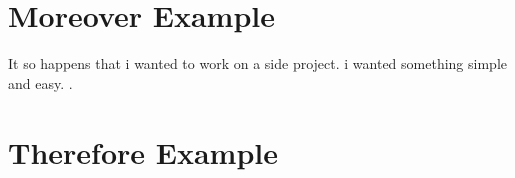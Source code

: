 \documentclass{article}
\begin{document}
\section{Moreover Example}

It so happens that i wanted to work on a side project. \Moreover i wanted something simple and easy. \moreover.

\Moreover

\Moreover

\Moreover

\Moreover



\section{Therefore Example}

\Therefore 

\Therefore

\Therefore

\Therefore

\Therefore
\end{document}
